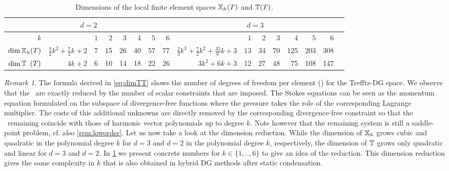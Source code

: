 \documentclass[sn-mathphys,Numbered]{sn-jnl}%
\theoremstyle{remark}%
\newtheorem{remark}{Remark}%
\theoremstyle{definition}%
\begin{document}
\begin{table}
  \small
    \begin{tabular}{@{}r@{~}|@{~}r@{~}|@{~~}r@{~~}r@{~~}r@{~~}r@{~~}r@{~~}r@{~}|@{~}r@{~}@{}|@{~}r@{~~}r@{~~}r@{~~}r@{~~}r@{~~}r@{~~}r@{}}
      \toprule
        \multicolumn{8}{c}{$d=2$} & \multicolumn{7}{c}{$d=3$} \\
      \midrule
$k $   && $1$
    & $2$
    & $3$
    & $4$
    & $5$
    & $6$ &
    & $1$
    & $2$
    & $3$
    & $4$
    & $5$
    & $6$ \\
    $\dim \mathbb{X}_h(T)$ & $\frac32 k^2\!+\!\frac72 k\!+\!2$ & 7 & 15 & 26 & 40 & 57 & 77
    & $\frac23 k^3\!+\!\frac72 k^2\!+\!\frac{35}{6} k\!+\!3$ & 13 & 34 & 70 & 125 & 203 & 308 \\
      $\dim \mathbb{T}_{\hphantom{h}}(T)$ & $4 k \!+\! 2$& 6 & 10 & 14 & 18 & 22 & 26
    & $3 k^2 + 6 k + 3 $&  12 & 27 & 48 & 75 & 108 & 147 \\
    \bottomrule
  \end{tabular}
  \caption{Dimensions of the local finite element spaces $\mathbb{X}_h(T)$ and $\mathbb{T}(T)$.}\label{tab:localdims}
\end{table}

\begin{remark}
  The formula derived in \eqref{eq:dimTT} shows the number of degrees of freedom
  per element (\ndofs) for the Trefftz-DG space. We observe that the \ndofs ~are
  exactly reduced by the number of scalar constraints that are imposed.
  The Stokes equations can be seen as the momentum equation formulated on the
  subspace of divergence-free functions where the pressure takes the role of the
  corresponding Lagrange multiplier. The costs of this additional unknowns are
  directly removed by the corresponding divergence-free constraint so that the
  \ndofs ~remaining coincide with those of harmonic vector polynomials up to
  degree $k$. Note however that the remaining system is still a saddle-point
  problem, cf. also \cref{rem:loworder}. Let us now take a look at the dimension reduction.
While the dimension of $\mathbb{X}_h$ grows cubic and quadratic in the polynomial degree $k$ for $d=3$ and $d=2$ in the polynomial degree $k$, respectively, the dimension of $\mathbb{T}$ grows only quadratic and linear for $d=3$ and $d=2$. In \cref{tab:localdims} we present concrete numbers for $k \in \{1,..,6\}$ to give an idea of the reduction. This dimension reduction gives the same complexity in $k$ that is also obtained in hybrid DG methods after static condensation.
\end{remark}
\end{document}
